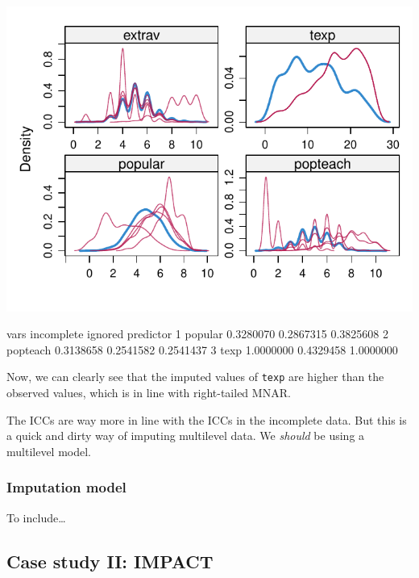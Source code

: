 \documentclass[
]{jss}
\begin{document}
\begin{CodeChunk}


\begin{center}\includegraphics{Manuscript_files/figure-latex/pop_predictor_eval-1} \end{center}

\begin{CodeOutput}
      vars incomplete   ignored predictor
1  popular  0.3280070 0.2867315 0.3825608
2 popteach  0.3138658 0.2541582 0.2541437
3     texp  1.0000000 0.4329458 1.0000000
\end{CodeOutput}
\end{CodeChunk}

Now, we can clearly see that the imputed values of \texttt{texp} are
higher than the observed values, which is in line with right-tailed
MNAR.

The ICCs are way more in line with the ICCs in the incomplete data. But
this is a quick and dirty way of imputing multilevel data. We
\emph{should} be using a multilevel model.

\hypertarget{imputation-model-2}{%
\subsubsection{Imputation model}\label{imputation-model-2}}

To include\ldots{}

\hypertarget{case-study-ii-impact}{%
\subsection{Case study II: IMPACT}\label{case-study-ii-impact}}
\end{document}
